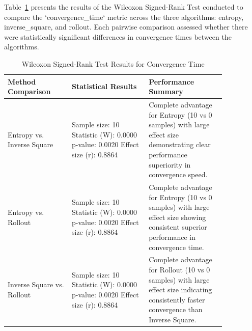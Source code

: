 \documentclass[../report.tex]{subfiles}
\begin{document}
    Table~\ref{tab:wilcoxon_results} presents the results of the Wilcoxon Signed-Rank Test conducted to compare the `convergence\_time` metric across the three algorithms: entropy, 
    inverse\_square, and rollout. Each pairwise comparison assessed whether there were statistically significant differences in convergence times between the algorithms.

    \begin{table}[ht]
        \caption{Wilcoxon Signed-Rank Test Results for Convergence Time}
        \label{tab:wilcoxon_results}
        \centering
        \begin{tabular}{|p{0.25\linewidth}|p{0.3\linewidth}|p{0.3\linewidth}|}
            \hline
            \rowcolor{gray!10} 
            Method Comparison & Statistical Results & Performance Summary \\
            \hline
            Entropy vs. Inverse Square & 
            Sample size: 10 \newline
            Statistic (W): 0.0000 \newline
            p-value: 0.0020 \newline
            Effect size (r): 0.8864 & 
            Complete advantage for Entropy (10 vs 0 samples) with large effect size demonstrating clear performance superiority in convergence speed. \\
            \hline
            Entropy vs. Rollout & 
            Sample size: 10 \newline
            Statistic (W): 0.0000 \newline
            p-value: 0.0020 \newline
            Effect size (r): 0.8864 & 
            Complete advantage for Entropy (10 vs 0 samples) with large effect size showing consistent superior performance in convergence time. \\
            \hline
            Inverse Square vs. Rollout & 
            Sample size: 10 \newline
            Statistic (W): 0.0000 \newline
            p-value: 0.0020 \newline
            Effect size (r): 0.8864 & 
            Complete advantage for Rollout (10 vs 0 samples) with large effect size indicating consistently faster convergence than Inverse Square. \\
        \hline
        \end{tabular}
    \end{table}
\end{document}
